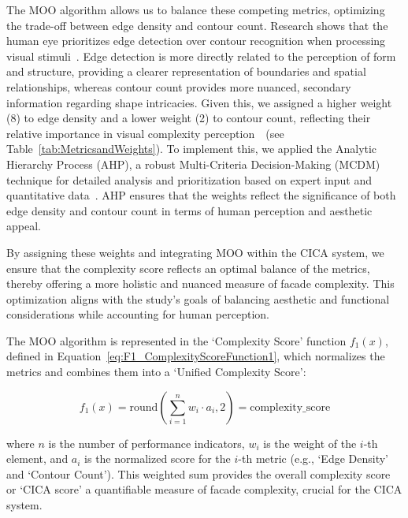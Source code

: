 The MOO algorithm allows us to balance these competing metrics, optimizing the trade-off between edge density and contour count.
Research shows that the human eye prioritizes edge detection over contour recognition when processing visual stimuli~\cite{Yang2022}.
Edge detection is more directly related to the perception of form and structure, providing a clearer representation of boundaries and spatial relationships, whereas contour count provides more nuanced, secondary information regarding shape intricacies.
Given this, we assigned a higher weight (8) to edge density and a lower weight (2) to contour count, reflecting their relative importance in visual complexity perception~\cite{Yang2022}~(see Table~\ref{tab:MetricsandWeights}).
To implement this, we applied the Analytic Hierarchy Process (AHP), a robust Multi-Criteria Decision-Making (MCDM) technique for detailed analysis and prioritization based on expert input and quantitative data~\cite{Taherdoost2023}.
AHP ensures that the weights reflect the significance of both edge density and contour count in terms of human perception and aesthetic appeal.

By assigning these weights and integrating MOO within the CICA system, we ensure that the complexity score reflects an optimal balance of the metrics, thereby offering a more holistic and nuanced measure of facade complexity.
This optimization aligns with the study's goals of balancing aesthetic and functional considerations while accounting for human perception.

The MOO algorithm is represented in the `Complexity Score' function \(f_1(x)\), defined in Equation~\ref{eq:F1_ComplexityScoreFunction1}, which normalizes the metrics and combines them into a `Unified Complexity Score':

\begin{equation}
    f_1(x) = \mathrm{round}\left(\sum_{i=1}^{n} w_i \cdot a_i, 2\right) = \text{complexity\_score}
    \label{eq:F1_ComplexityScoreFunction1}
\end{equation}

where \(n\) is the number of performance indicators, \(w_i\) is the weight of the \(i\)-th element, and \(a_i\) is the normalized score for the \(i\)-th metric (e.g., `Edge Density' and `Contour Count').
This weighted sum provides the overall complexity score or `CICA score' a quantifiable measure of facade complexity, crucial for the CICA system.

